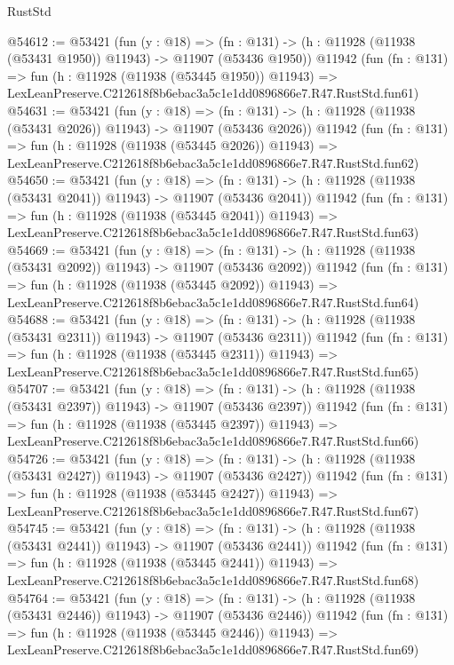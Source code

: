 \begin{lexlean}{RustStd}
\begin{coremodule}
@54612 := @53421
    (fun (y : @18) =>
    (fn : @131) -> (h : @11928 (@11938 (@53431 @1950)) @11943) -> @11907 (@53436 @1950))
    @11942
    (fun (fn : @131) =>
    fun (h : @11928 (@11938 (@53445 @1950)) @11943) =>
    LexLeanPreserve.C212618f8b6ebac3a5c1e1dd0896866e7.R47.RustStd.fun61)
@54631 := @53421
    (fun (y : @18) =>
    (fn : @131) -> (h : @11928 (@11938 (@53431 @2026)) @11943) -> @11907 (@53436 @2026))
    @11942
    (fun (fn : @131) =>
    fun (h : @11928 (@11938 (@53445 @2026)) @11943) =>
    LexLeanPreserve.C212618f8b6ebac3a5c1e1dd0896866e7.R47.RustStd.fun62)
@54650 := @53421
    (fun (y : @18) =>
    (fn : @131) -> (h : @11928 (@11938 (@53431 @2041)) @11943) -> @11907 (@53436 @2041))
    @11942
    (fun (fn : @131) =>
    fun (h : @11928 (@11938 (@53445 @2041)) @11943) =>
    LexLeanPreserve.C212618f8b6ebac3a5c1e1dd0896866e7.R47.RustStd.fun63)
@54669 := @53421
    (fun (y : @18) =>
    (fn : @131) -> (h : @11928 (@11938 (@53431 @2092)) @11943) -> @11907 (@53436 @2092))
    @11942
    (fun (fn : @131) =>
    fun (h : @11928 (@11938 (@53445 @2092)) @11943) =>
    LexLeanPreserve.C212618f8b6ebac3a5c1e1dd0896866e7.R47.RustStd.fun64)
@54688 := @53421
    (fun (y : @18) =>
    (fn : @131) -> (h : @11928 (@11938 (@53431 @2311)) @11943) -> @11907 (@53436 @2311))
    @11942
    (fun (fn : @131) =>
    fun (h : @11928 (@11938 (@53445 @2311)) @11943) =>
    LexLeanPreserve.C212618f8b6ebac3a5c1e1dd0896866e7.R47.RustStd.fun65)
@54707 := @53421
    (fun (y : @18) =>
    (fn : @131) -> (h : @11928 (@11938 (@53431 @2397)) @11943) -> @11907 (@53436 @2397))
    @11942
    (fun (fn : @131) =>
    fun (h : @11928 (@11938 (@53445 @2397)) @11943) =>
    LexLeanPreserve.C212618f8b6ebac3a5c1e1dd0896866e7.R47.RustStd.fun66)
@54726 := @53421
    (fun (y : @18) =>
    (fn : @131) -> (h : @11928 (@11938 (@53431 @2427)) @11943) -> @11907 (@53436 @2427))
    @11942
    (fun (fn : @131) =>
    fun (h : @11928 (@11938 (@53445 @2427)) @11943) =>
    LexLeanPreserve.C212618f8b6ebac3a5c1e1dd0896866e7.R47.RustStd.fun67)
@54745 := @53421
    (fun (y : @18) =>
    (fn : @131) -> (h : @11928 (@11938 (@53431 @2441)) @11943) -> @11907 (@53436 @2441))
    @11942
    (fun (fn : @131) =>
    fun (h : @11928 (@11938 (@53445 @2441)) @11943) =>
    LexLeanPreserve.C212618f8b6ebac3a5c1e1dd0896866e7.R47.RustStd.fun68)
@54764 := @53421
    (fun (y : @18) =>
    (fn : @131) -> (h : @11928 (@11938 (@53431 @2446)) @11943) -> @11907 (@53436 @2446))
    @11942
    (fun (fn : @131) =>
    fun (h : @11928 (@11938 (@53445 @2446)) @11943) =>
    LexLeanPreserve.C212618f8b6ebac3a5c1e1dd0896866e7.R47.RustStd.fun69)

\end{coremodule}
\end{lexlean}
